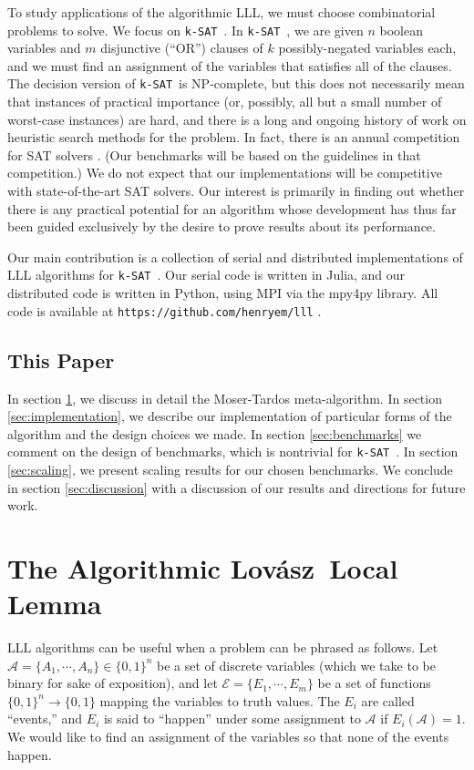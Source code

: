 \documentclass[twocolumn]{article}
\newcommand{\ksat}{\texttt{k-SAT}~}
\newcommand{\lovasz}{Lov\'{a}sz~}
\begin{document}
To study applications of the algorithmic LLL, we must choose combinatorial problems to solve.  We focus on \ksat.  In \ksat, we are given $n$ boolean variables and $m$ disjunctive (``OR'') clauses of $k$ possibly-negated variables each, and we must find an assignment of the variables that satisfies all of the clauses.  The decision version of \ksat is NP-complete, but this does not necessarily mean that instances of practical importance (or, possibly, all but a small number of worst-case instances) are hard, and there is a long and ongoing history of work on heuristic search methods for the problem.  In fact, there is an annual competition for SAT solvers \cite{belov2014sat}.  (Our benchmarks will be based on the guidelines in that competition.)  We do not expect that our implementations will be competitive with state-of-the-art SAT solvers.  Our interest is primarily in finding out whether there is any practical potential for an algorithm whose development has thus far been guided exclusively by the desire to prove results about its performance.

Our main contribution is a collection of serial and distributed implementations of LLL algorithms for \ksat.  Our serial code is written in Julia, and our distributed code is written in Python, using MPI via the mpy4py library.  All code is available at \texttt{https://github.com/henryem/lll} .

\subsection{This Paper}
In section \ref{sec:alll}, we discuss in detail the Moser-Tardos meta-algorithm.  In section \ref{sec:implementation}, we describe our implementation of particular forms of the algorithm and the design choices we made.  In section \ref{sec:benchmarks} we comment on the design of benchmarks, which is nontrivial for \ksat.  In section \ref{sec:scaling}, we present scaling results for our chosen benchmarks.  We conclude in section \ref{sec:discussion} with a discussion of our results and directions for future work.

\section{The Algorithmic \lovasz Local Lemma}
\label{sec:alll}
LLL algorithms can be useful when a problem can be phrased as follows.  Let $\mathcal{A} = \{A_1, \cdots, A_n\} \in \{0,1\}^n$ be a set of discrete variables (which we take to be binary for sake of exposition), and let $\mathcal{E} = \{E_1, \cdots, E_m\}$ be a set of functions $\{0,1\}^n \to \{0,1\}$ mapping the variables to truth values.  The $E_i$ are called ``events,'' and $E_i$ is said to ``happen'' under some assignment to $\mathcal{A}$ if $E_i(\mathcal{A}) = 1$.  We would like to find an assignment of the variables so that none of the events happen.
\end{document}
